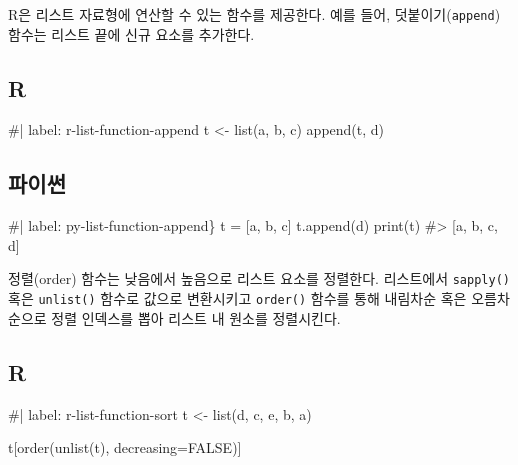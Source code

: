 \documentclass[
  letterpaper,
]{book}
\newenvironment{Shaded}{\begin{snugshade}}{\end{snugshade}}
\newcommand{\NormalTok}[1]{\textcolor[rgb]{0.00,0.23,0.31}{#1}}
\begin{document}
 

R은 리스트 자료형에 연산할 수 있는 함수를 제공한다. 예를 들어,
덧붙이기(\texttt{append}) 함수는 리스트 끝에 신규 요소를 추가한다.

\subsection{R}

\begin{Shaded}
\begin{Highlighting}[]
\NormalTok{\#| label: r{-}list{-}function{-}append}
\NormalTok{t \textless{}{-} list(\textquotesingle{}a\textquotesingle{}, \textquotesingle{}b\textquotesingle{}, \textquotesingle{}c\textquotesingle{})}
\NormalTok{append(t, \textquotesingle{}d\textquotesingle{})}
\end{Highlighting}
\end{Shaded}

\subsection{파이썬}

\begin{Shaded}
\begin{Highlighting}[]
\NormalTok{\#| label: py{-}list{-}function{-}append\}}
\NormalTok{t = [\textquotesingle{}a\textquotesingle{}, \textquotesingle{}b\textquotesingle{}, \textquotesingle{}c\textquotesingle{}]}
\NormalTok{t.append(\textquotesingle{}d\textquotesingle{})}
\NormalTok{print(t)}
\NormalTok{\#\textgreater{} [\textquotesingle{}a\textquotesingle{}, \textquotesingle{}b\textquotesingle{}, \textquotesingle{}c\textquotesingle{}, \textquotesingle{}d\textquotesingle{}]}
\end{Highlighting}
\end{Shaded}

정렬(order) 함수는 낮음에서 높음으로 리스트 요소를 정렬한다. 리스트에서
\texttt{sapply()} 혹은 \texttt{unlist()} 함수로 값으로 변환시키고
\texttt{order()} 함수를 통해 내림차순 혹은 오름차순으로 정렬 인덱스를
뽑아 리스트 내 원소를 정렬시킨다.  

\subsection{R}

\begin{Shaded}
\begin{Highlighting}[]
\NormalTok{\#| label: r{-}list{-}function{-}sort}
\NormalTok{t \textless{}{-} list(\textquotesingle{}d\textquotesingle{}, \textquotesingle{}c\textquotesingle{}, \textquotesingle{}e\textquotesingle{}, \textquotesingle{}b\textquotesingle{}, \textquotesingle{}a\textquotesingle{})}

\NormalTok{t[order(unlist(t), decreasing=FALSE)]}
\end{Highlighting}
\end{Shaded}
\end{document}
